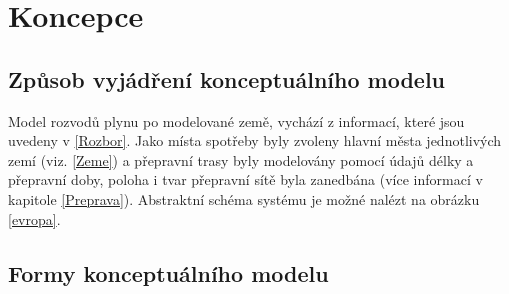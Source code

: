 \documentclass[a4paper,11pt]{article}
\begin{document}
\newpage

\section{Koncepce}



\subsection{Způsob vyjádření konceptuálního modelu}

Model rozvodů plynu po modelované země, vychází z informací, které jsou uvedeny v \ref{Rozbor}.
Jako místa spotřeby byly zvoleny hlavní města jednotlivých zemí (viz. \ref{Zeme})
a přepravní trasy byly modelovány pomocí údajů délky a přepravní doby, poloha i tvar přepravní sítě byla zanedbána
(více informací v kapitole \ref{Preprava}). 
Abstraktní schéma systému je možné nalézt na obrázku \ref{evropa}.

\subsection{Formy konceptuálního modelu}
\end{document}
